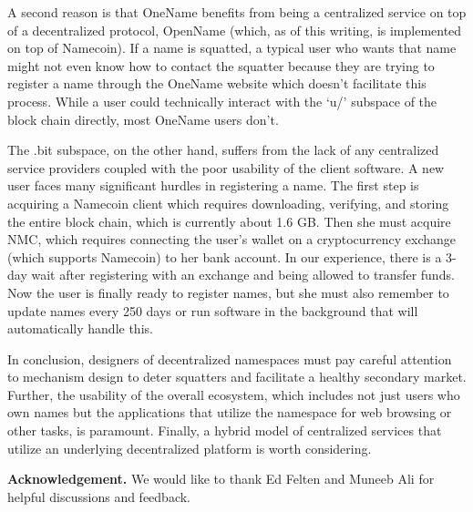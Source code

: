 A second reason is that OneName benefits from being a centralized service on top of a decentralized protocol, OpenName (which, as of this writing, is implemented on top of Namecoin). If a name is squatted, a typical user who wants that name might not even know how to contact the squatter because they are trying to register a name through the OneName website which doesn't facilitate this process. While a user could technically interact with the `u/' subspace of the block chain directly, most OneName users don't.

The .bit subspace, on the other hand, suffers from the lack of any centralized service providers coupled with the poor usability of the client software. A new user faces many significant hurdles in registering a name. The first step is acquiring a Namecoin client which requires downloading, verifying, and storing the entire block chain, which is currently about 1.6 GB. Then she must acquire NMC, which requires connecting the user's wallet on a cryptocurrency exchange (which supports Namecoin) to her bank account. In our experience, there is a 3-day wait after registering with an exchange and being allowed to transfer funds. Now the user is finally ready to register names, but she must also remember to update names every 250 days or run software in the background that will automatically handle this.

In conclusion, designers of decentralized namespaces must pay careful attention to mechanism design to deter squatters and facilitate a healthy secondary market. Further, the usability of the overall ecosystem, which includes not just users who own names but the applications that utilize the namespace for web browsing or other tasks, is paramount. Finally, a hybrid model of centralized services that utilize an underlying decentralized platform is worth considering.

{\bf Acknowledgement.} We would like to thank Ed Felten and Muneeb Ali for helpful discussions and feedback.

